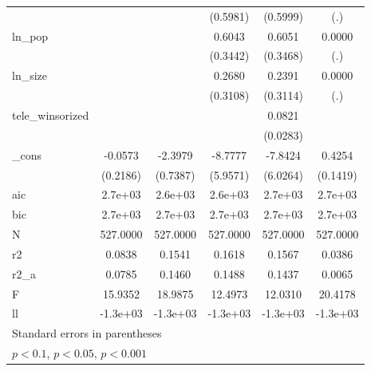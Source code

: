 {\begin{tabular}{l*{5}{c}}
            &                     &                     &    (0.5981)         &    (0.5999)         &         (.)         \\
ln\_pop      &                     &                     &      0.6043\sym{*}  &      0.6051\sym{*}  &      0.0000         \\
            &                     &                     &    (0.3442)         &    (0.3468)         &         (.)         \\
ln\_size     &                     &                     &      0.2680         &      0.2391         &      0.0000         \\
            &                     &                     &    (0.3108)         &    (0.3114)         &         (.)         \\
tele\_winsorized&                     &                     &                     &      0.0821\sym{**} &                     \\
            &                     &                     &                     &    (0.0283)         &                     \\
\_cons      &     -0.0573         &     -2.3979\sym{**} &     -8.7777         &     -7.8424         &      0.4254\sym{**} \\
            &    (0.2186)         &    (0.7387)         &    (5.9571)         &    (6.0264)         &    (0.1419)         \\
\midrule
aic         &     2.7e+03         &     2.6e+03         &     2.6e+03         &     2.7e+03         &     2.7e+03         \\
bic         &     2.7e+03         &     2.7e+03         &     2.7e+03         &     2.7e+03         &     2.7e+03         \\
N           &    527.0000         &    527.0000         &    527.0000         &    527.0000         &    527.0000         \\
r2          &      0.0838         &      0.1541         &      0.1618         &      0.1567         &      0.0386         \\
r2\_a        &      0.0785         &      0.1460         &      0.1488         &      0.1437         &      0.0065         \\
F           &     15.9352         &     18.9875         &     12.4973         &     12.0310         &     20.4178         \\
ll          &    -1.3e+03         &    -1.3e+03         &    -1.3e+03         &    -1.3e+03         &    -1.3e+03         \\
\bottomrule
\multicolumn{6}{l}{\footnotesize Standard errors in parentheses}\\
\multicolumn{6}{l}{\footnotesize \sym{*} \(p<0.1\), \sym{**} \(p<0.05\), \sym{***} \(p<0.001\)}\\
\end{tabular}
}
